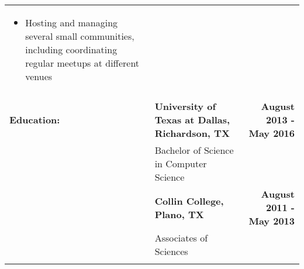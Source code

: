 \documentclass{letter}
\begin{document}
\begin{center}
\begin{tabulary}{\textwidth}{llr}
{{\begin{itemize}
\item Hosting and managing several small communities, including coordinating regular meetups at different venues
\end{itemize} } } \\
\\
{ \large \textbf{Education:} } & \textbf{University of Texas at Dallas, Richardson, TX} & \textbf{August 2013 - May 2016} \\
& Bachelor of Science in Computer Science \\[7pt]
& \textbf{Collin College, Plano, TX} & \textbf{August 2011 - May 2013} \\
 & Associates of Sciences \\
\\
\end{tabulary}
\end{center}
\end{document}
